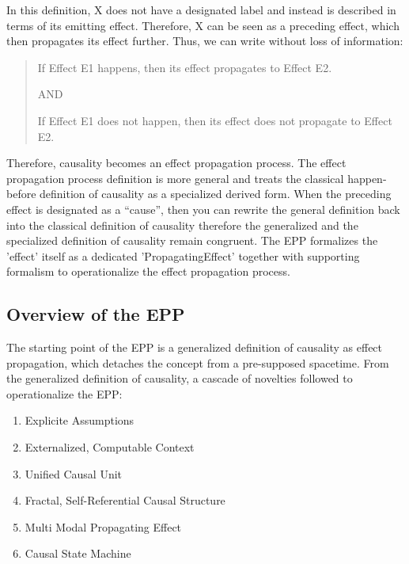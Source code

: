 In this definition, X does not have a designated label and instead is described in terms of its emitting effect. Therefore, X can be seen as a preceding effect, which then propagates its effect further. Thus, we can write without loss of information:


\begin{quote}
	If Effect E1 happens, then its effect propagates to Effect E2.

    AND
    
	If Effect E1 does not happen, then its effect does not propagate to Effect E2.
\end{quote}

Therefore, causality becomes an effect propagation process. The effect propagation process definition is more general and treats the classical happen-before definition of causality as a specialized derived form. When the preceding effect is designated as a “cause”, then you can rewrite the general definition back into the classical definition of causality therefore the generalized and the specialized definition of causality remain congruent. The EPP formalizes the 'effect' itself as a dedicated 'PropagatingEffect' together with supporting formalism to operationalize the effect propagation process. 

% 
%
\subsection{Overview of the EPP}
\label{sec:epp_overview}

The starting point of the EPP is a generalized definition of causality as effect propagation, which detaches the concept from a pre-supposed spacetime. From the generalized definition of causality, a cascade of novelties followed to operationalize the EPP:

%
%
\begin{enumerate}
	\item Explicite Assumptions 
	\item Externalized, Computable Context
	\item Unified Causal Unit
	\item Fractal, Self-Referential Causal Structure
	\item Multi Modal Propagating Effect
	\item Causal State Machine 
\end{enumerate}

\newpage


